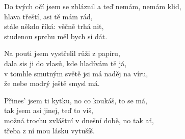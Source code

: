 
\ve{}
Do tvých očí jsem se zbláznil a teď nemám, nemám klid,\\
hlava třeští, asi tě mám rád,\\
stále někdo říká:  věčně trhá nit,\\
studenou sprchu měl bych si dát. 

\cho{}
Na pouti jsem vystřelil růži z papíru,\\
dala sis ji do vlasů, kde hladívám tě já,\\
v tomhle smutným světě jsi má naděj na víru,\\
že nebe modrý ještě smysl má. 

\ve{}
Přines' jsem ti kytku, no co koukáš, to se má,\\
tak jsem asi jinej, teď to víš,\\
možná trochu zvláštní v dnešní době, no tak ať,\\
třeba z ní mou lásku vytušíš. 

\cho{}

\cho{}

\esong{}
